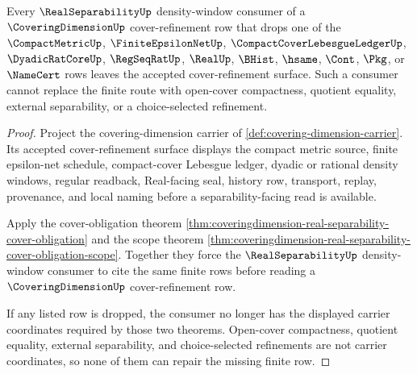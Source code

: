\begin{theorem}
\label{thm:coveringdimension-real-separability-cover-nonescape}
Every $\RealSeparabilityUp$ density-window consumer of a $\CoveringDimensionUp$ cover-refinement row that drops one of the $\CompactMetricUp$, $\FiniteEpsilonNetUp$, $\CompactCoverLebesgueLedgerUp$, $\DyadicRatCoreUp$, $\RegSeqRatUp$, $\RealUp$, $\BHist$, $\hsame$, $\Cont$, $\Pkg$, or $\NameCert$ rows leaves the accepted cover-refinement surface. Such a consumer cannot replace the finite route with open-cover compactness, quotient equality, external separability, or a choice-selected refinement.
\end{theorem}
\begin{proof}
Project the covering-dimension carrier of \autoref{def:covering-dimension-carrier}. Its accepted cover-refinement surface displays the compact metric source, finite epsilon-net schedule, compact-cover Lebesgue ledger, dyadic or rational density windows, regular readback, Real-facing seal, history row, transport, replay, provenance, and local naming before a separability-facing read is available.

Apply the cover-obligation theorem \autoref{thm:coveringdimension-real-separability-cover-obligation} and the scope theorem \autoref{thm:coveringdimension-real-separability-cover-obligation-scope}. Together they force the $\RealSeparabilityUp$ density-window consumer to cite the same finite rows before reading a $\CoveringDimensionUp$ cover-refinement row.

If any listed row is dropped, the consumer no longer has the displayed carrier coordinates required by those two theorems. Open-cover compactness, quotient equality, external separability, and choice-selected refinements are not carrier coordinates, so none of them can repair the missing finite row.
\end{proof}
